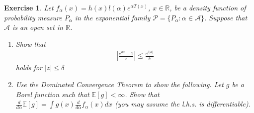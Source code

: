 \documentclass[12pt]{article}
\theoremstyle{colon}
\newtheorem{exercise}{Exercise}
\begin{document}
\begin{exercise}
  Let $f_\alpha(x) = h(x)l(\alpha)e^{\alpha T(x)}$, $x \in \mathbb{R}$, be a density function of probability measure $P_\alpha$ in the exponential family $\mathcal{P} = \{ P_\alpha: \alpha \in \mathcal{A} \}$. Suppose that $\mathcal{A}$ is an open set in $\mathbb{R}$.
  \begin{enumerate}[label=\arabic*)]
    \item Show that
      \begin{gather*}
        \left \lvert \frac{e^{az}-1}{z} \right \rvert \leq \frac{e^{\delta \lvert a \rvert }}{\delta}
      \end{gather*}
      holds for $\lvert z \rvert \leq \delta$
    \item Use the Dominated Convergence Theorem to show the following. Let $g$ be a Borel function such that $\mathbb{E}[g] < \infty$. Show that $\frac{d}{d\alpha} \mathbb{E}[g] = \int g(x) \frac{d}{d\alpha} f_\alpha(x)dx$ (you may assume the l.h.s. is differentiable).
  \end{enumerate}
\end{exercise}
\end{document}
